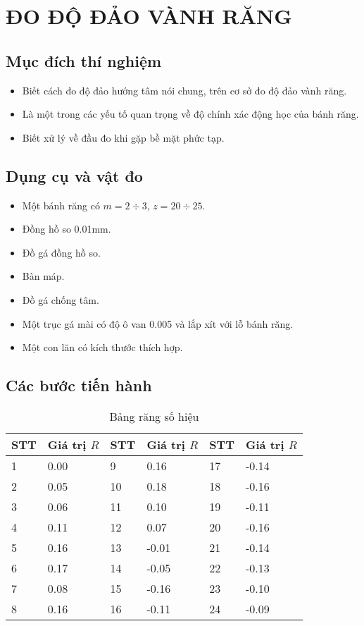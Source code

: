 \chapter{ĐO ĐỘ ĐẢO VÀNH RĂNG}

\section{Mục đích thí nghiệm}
\begin{itemize}
	\item Biết cách đo độ đảo hướng tâm nói chung, trên cơ sở đo độ đảo vành răng.
	\item Là một trong các yếu tố quan trọng về độ chính xác động học của bánh răng.
	\item Biết xử lý về đầu đo khi gặp bề mặt phức tạp.
\end{itemize}

\section{Dụng cụ và vật đo}
\begin{itemize}
	\item Một bánh răng có $ m=2\div 3 $, $ z=20\div 25 $.
	\item Đồng hồ so 0.01mm.
	\item Đồ gá đồng hồ so.
	\item Bàn máp.
	\item Đồ gá chống tâm.
	\item Một trục gá mài có độ ô van 0.005 và lắp xít với lỗ bánh răng.
	\item Một con lăn có kích thước thích hợp.
\end{itemize}

\section{Các bước tiến hành}
\begin{table}[ht]
	\centering
	\caption{Bảng răng số hiệu}
	\begin{tabular}{llllll}\toprule
		STT & Giá trị $ R $ & STT & Giá trị $ R $ & STT & Giá trị $ R $\\\midrule
		1 & 0.00 & 9 & 0.16 & 17 & -0.14 \\
		2 & 0.05 & 10 & 0.18 & 18 & -0.16\\
		3 & 0.06 & 11 & 0.10 & 19 & -0.11\\
		4 & 0.11 & 12 & 0.07 & 20 & -0.16\\
		5 & 0.16 & 13 & -0.01 & 21 & -0.14 \\
		6 & 0.17 & 14 & -0.05 & 22 & -0.13\\
		7 & 0.08 & 15 & -0.16 & 23 & -0.10\\
		8 & 0.16 & 16 & -0.11 & 24 & -0.09\\
		\bottomrule
	\end{tabular}
\end{table}

